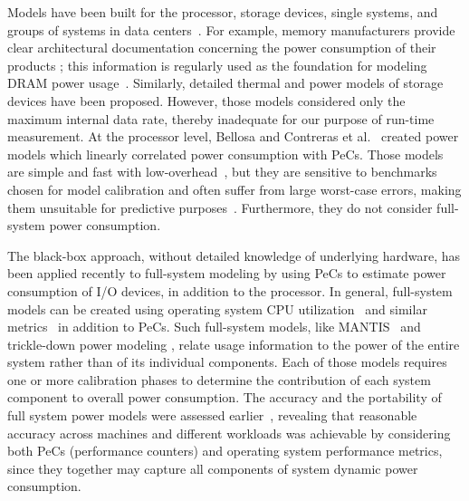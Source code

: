 Models have been built for the processor, storage devices, single
systems, and groups of systems in data
centers~\cite{Kadayif2001,Isci2003b}.  For example, memory manufacturers
provide clear architectural documentation concerning the power
consumption of their products \cite{Micron2007}; this information is
regularly used as the foundation for modeling DRAM power
usage~\cite{Liu2008,Lewis2008}.  Similarly, detailed thermal and power
models of storage devices \cite{Gurumurthi2005} have been proposed.
However, those models considered only the maximum internal data rate,
thereby inadequate for our purpose of run-time measurement.  At the
processor level, Bellosa \citeyear{Bellosa2003} and Contreras et al.\
\citeyear{Contreras2005} created power models which linearly correlated
power consumption with PeCs.  Those models are simple and fast with
low-overhead~\cite{Bircher2007,Powell2009,Bircher2011}, but they are
sensitive to benchmarks chosen for model calibration and often suffer
from large worst-case errors, making them unsuitable for predictive
purposes~\cite{McCullough2011}.  Furthermore, they do not consider
full-system power consumption.

The black-box approach, without detailed knowledge of underlying
hardware, has been applied recently to full-system modeling
\cite{Bircher2007,Bircher2011} by using PeCs to estimate power
consumption of I/O devices, in addition to the processor.  In general,
full-system models can be created using operating system CPU
utilization~\cite{Fan2007} and similar metrics~\cite{Heath2005} in
addition to PeCs. Such full-system models, like
MANTIS~\cite{Economou2006,Rivoire2008a} and trickle-down power modeling
\cite{Bircher2011}, relate usage information to the power of the entire
system rather than of its individual components.  Each of those models
requires one or more calibration phases to determine the contribution of
each system component to overall power consumption.  The accuracy and
the portability of full system power models were assessed
earlier~\cite{Rivoire2008b}, revealing that reasonable accuracy across
machines and different workloads was achievable by considering both PeCs
(performance counters) and operating system performance metrics, since
they together may capture all components of system dynamic power
consumption.

